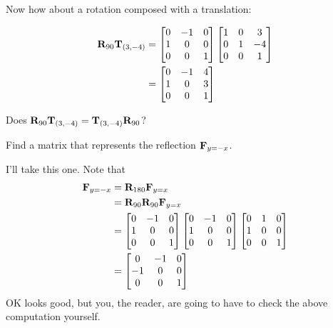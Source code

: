Now how about a rotation composed with a translation:

\begin{align*}
\mathbf{R}_{90}\mathbf{T}_{(3,-4)} &= \begin{bmatrix}
0 & -1 & 0\\
1 & 0 & 0\\
0 & 0 & 1
\end{bmatrix}
\begin{bmatrix}
1 & 0 & 3\\
0 & 1 & -4\\
0 & 0 & 1
\end{bmatrix}\\
&=
\begin{bmatrix}
0 & -1 & 4\\
1 & 0 & 3\\
0 & 0 & 1
\end{bmatrix}
\end{align*}

\begin{question}
Does $\mathbf{R}_{90}\mathbf{T}_{(3,-4)}= \mathbf{T}_{(3,-4)}\mathbf{R}_{90}$?
\end{question}
\QM

\begin{question} Find a matrix that represents the reflection $\mathbf{F}_{y=-x}$.
\end{question}

I'll take this one. Note that 
\begin{align*}
\mathbf{F}_{y=-x} &= \mathbf{R}_{180} \mathbf{F}_{y=x} \\
&= \mathbf{R}_{90}\mathbf{R}_{90} \mathbf{F}_{y=x}\\
&= \begin{bmatrix}
0 & -1 & 0\\
1 & 0 & 0\\
0 & 0 & 1
\end{bmatrix}
\begin{bmatrix}
0 & -1 & 0\\
1 & 0 & 0\\
0 & 0 & 1
\end{bmatrix}
\begin{bmatrix}
0&  1 & 0\\
1 & 0 & 0\\
0 &  0 & 1
\end{bmatrix} \\
&=\begin{bmatrix}
0 &  -1 & 0\\
-1 & 0 & 0\\
0 &  0 & 1
\end{bmatrix} 
\end{align*}
OK looks good, but you, the reader, are going to have to check the
above computation yourself.




